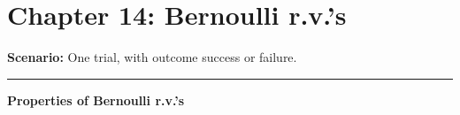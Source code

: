 \documentclass[12pt]{amsart}
\newtheorem{example}[theorem]{Example}
\begin{document}
\setcounter{section}{14}
{\huge  
\section*{Chapter 14: Bernoulli r.v.'s}
}

{\large 




\vspace{.5cm}

\textbf{Scenario:} One trial, with outcome success or failure.

\vspace{.5cm}
\hrule
\vspace{.5cm}






\textbf{Properties of Bernoulli r.v.'s}



\newpage

}
\end{document}
